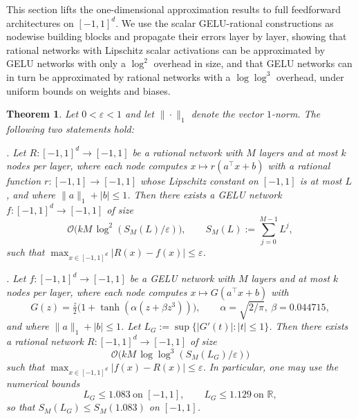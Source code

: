 \documentclass{article}
\theoremstyle{plain}
\newtheorem{theorem}{Theorem}[section]
\theoremstyle{definition}
\theoremstyle{remark}
\begin{document}
This section lifts the one-dimensional approximation results to full feedforward architectures on $[-1,1]^d$. We use the scalar GELU-rational constructions as nodewise building blocks and propagate their errors layer by layer, showing that rational networks with Lipschitz scalar activations can be approximated by GELU networks with only a $\log^2$ overhead in size, and that GELU networks can in turn be approximated by rational networks with a $\log\log^3$ overhead, under uniform bounds on weights and biases.

\begin{theorem}
Let $0<\varepsilon<1$ and let $\|\cdot\|_1$ denote the vector $1$-norm. The following two statements hold:

. Let $R:[-1,1]^d\to[-1,1]$ be a rational network with $M$ layers and at most $k$ nodes per layer, where each node computes $x\mapsto r(a^\top x+b)$ with a rational function $r:[-1,1]\to[-1,1]$ whose Lipschitz constant on $[-1,1]$ is at most $L$, and where $\|a\|_1+|b|\le 1$. Then there exists a GELU network $f:[-1,1]^d\to[-1,1]$ of size
\[
\mathcal{O}\bigl(kM\,\log^2(S_M(L)/\varepsilon)\bigr),
\qquad
S_M(L):=\sum_{j=0}^{M-1}L^j,
\]
such that $\max_{x\in[-1,1]^d}|R(x)-f(x)|\le\varepsilon$.

. Let $f:[-1,1]^d\to[-1,1]$ be a GELU network with $M$ layers and at most $k$ nodes per layer, where each node computes $x\mapsto G(a^\top x+b)$ with
\[
G(z)=\tfrac{z}{2}\bigl(1+\tanh(\alpha(z+\beta z^3))\bigr),\qquad \alpha=\sqrt{2/\pi},\ \beta=0.044715,
\]
and where $\|a\|_1+|b|\le 1$. Let $L_G:=\sup\{|G'(t)|:|t|\le 1\}$. Then there exists a rational network $R:[-1,1]^d\to[-1,1]$ of size
\[
\mathcal{O}\bigl(kM\,\log\log^3(S_M(L_G)/\varepsilon)\bigr)
\]
such that $\max_{x\in[-1,1]^d}|f(x)-R(x)|\le\varepsilon$. In particular, one may use the numerical bounds
\[
L_G\le 1.083\ \text{on }[-1,1],\qquad L_G\le 1.129\ \text{on }\mathbb{R},
\]
so that $S_M(L_G)\le S_M(1.083)$ on $[-1,1]$.
\end{theorem}
\end{document}
